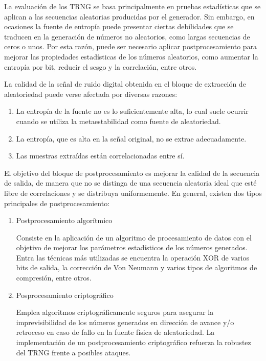             La evaluación de los TRNG se basa principalmente en pruebas estadísticas que se aplican a las secuencias aleatorias producidas por el generador. Sin embargo, en ocasiones la fuente de entropía puede presentar ciertas debilidades que se traducen en la generación de números no aleatorios, como largas secuencias de ceros o unos. Por esta razón, puede ser necesario aplicar postprocesamiento para mejorar las propiedades estadísticas de los números aleatorios, como aumentar la entropía por bit, reducir el sesgo y la correlación, entre otros.
                
            La calidad de la señal de ruido digital obtenida en el bloque de extracción de aleatoriedad puede verse afectada por diversas razones:

            \begin{enumerate}[noitemsep, label=(\alph*)]
                \item La entropía de la fuente no es lo suficientemente alta, lo cual suele ocurrir cuando se utiliza la metaestabilidad como fuente de aleatoriedad.
                \item La entropía, que es alta en la señal original, no se extrae adecuadamente.
                \item Las muestras extraídas están correlacionadas entre sí. 
            \end{enumerate}		

	
	        El objetivo del bloque de postprocesamiento es mejorar la calidad de la secuencia de salida, de manera que no se distinga de una secuencia aleatoria ideal que esté libre de correlaciones y se distribuya uniformemente. En general, existen dos tipos principales de postprocesamiento:

            \begin{enumerate}
                \item Postprocesamiento algorítmico

                    Consiste en la aplicación de un algoritmo de procesamiento de datos con el objetivo de mejorar los parámetros estadísticos de los números generados. Entra las técnicas más utilizadas se encuentra la operación XOR de varios bits de salida, la corrección de Von Neumann y varios tipos de algoritmos de compresión, entre otros.
                \item Posprocesamiento criptográfico 

                    Emplea algoritmos criptográficamente seguros para asegurar la imprevisibilidad de los números generados en dirección de avance y/o retroceso en caso de fallo en la fuente física de aleatoriedad. La implementación de un postprocesamiento criptográfico refuerza la robustez del TRNG frente a posibles ataques.
            \end{enumerate}
    
